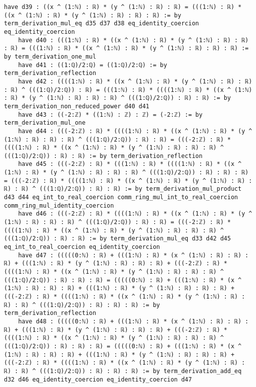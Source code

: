\documentclass{article}
\begin{document}
\begin{tcolorbox}[colback=white!10, width=\linewidth]
\begin{lstlisting}[language=Lean4]
    have d39 : ((x ^ (1:ℕ) : ℝ) * (y ^ (1:ℕ) : ℝ) : ℝ) = (((1:ℕ) : ℝ) * ((x ^ (1:ℕ) : ℝ) * (y ^ (1:ℕ) : ℝ) : ℝ) : ℝ) := by term_derivation_mul_eq d35 d37 d38 eq_identity_coercion eq_identity_coercion
    have d40 : (((1:ℕ) : ℝ) * ((x ^ (1:ℕ) : ℝ) * (y ^ (1:ℕ) : ℝ) : ℝ) : ℝ) = (((1:ℕ) : ℝ) * ((x ^ (1:ℕ) : ℝ) * (y ^ (1:ℕ) : ℝ) : ℝ) : ℝ) := by term_derivation_one_mul
    have d41 : ((1:ℚ)/2:ℚ) = ((1:ℚ)/2:ℚ) := by term_derivation_reflection
    have d42 : ((((1:ℕ) : ℝ) * ((x ^ (1:ℕ) : ℝ) * (y ^ (1:ℕ) : ℝ) : ℝ) : ℝ) ^ (((1:ℚ)/2:ℚ)) : ℝ) = (((1:ℕ) : ℝ) * ((((1:ℕ) : ℝ) * ((x ^ (1:ℕ) : ℝ) * (y ^ (1:ℕ) : ℝ) : ℝ) : ℝ) ^ (((1:ℚ)/2:ℚ)) : ℝ) : ℝ) := by term_derivation_non_reduced_power d40 d41
    have d43 : ((-2:ℤ) * ((1:ℕ) : ℤ) : ℤ) = (-2:ℤ) := by term_derivation_mul_one
    have d44 : (((-2:ℤ) : ℝ) * ((((1:ℕ) : ℝ) * ((x ^ (1:ℕ) : ℝ) * (y ^ (1:ℕ) : ℝ) : ℝ) : ℝ) ^ (((1:ℚ)/2:ℚ)) : ℝ) : ℝ) = (((-2:ℤ) : ℝ) * ((((1:ℕ) : ℝ) * ((x ^ (1:ℕ) : ℝ) * (y ^ (1:ℕ) : ℝ) : ℝ) : ℝ) ^ (((1:ℚ)/2:ℚ)) : ℝ) : ℝ) := by term_derivation_reflection
    have d45 : (((-2:ℤ) : ℝ) * (((1:ℕ) : ℝ) * ((((1:ℕ) : ℝ) * ((x ^ (1:ℕ) : ℝ) * (y ^ (1:ℕ) : ℝ) : ℝ) : ℝ) ^ (((1:ℚ)/2:ℚ)) : ℝ) : ℝ) : ℝ) = (((-2:ℤ) : ℝ) * ((((1:ℕ) : ℝ) * ((x ^ (1:ℕ) : ℝ) * (y ^ (1:ℕ) : ℝ) : ℝ) : ℝ) ^ (((1:ℚ)/2:ℚ)) : ℝ) : ℝ) := by term_derivation_mul_product d43 d44 eq_int_to_real_coercion comm_ring_mul_int_to_real_coercion comm_ring_mul_identity_coercion
    have d46 : (((-2:ℤ) : ℝ) * ((((1:ℕ) : ℝ) * ((x ^ (1:ℕ) : ℝ) * (y ^ (1:ℕ) : ℝ) : ℝ) : ℝ) ^ (((1:ℚ)/2:ℚ)) : ℝ) : ℝ) = (((-2:ℤ) : ℝ) * ((((1:ℕ) : ℝ) * ((x ^ (1:ℕ) : ℝ) * (y ^ (1:ℕ) : ℝ) : ℝ) : ℝ) ^ (((1:ℚ)/2:ℚ)) : ℝ) : ℝ) := by term_derivation_mul_eq d33 d42 d45 eq_int_to_real_coercion eq_identity_coercion
    have d47 : (((((0:ℕ) : ℝ) + (((1:ℕ) : ℝ) * (x ^ (1:ℕ) : ℝ) : ℝ) : ℝ) + (((1:ℕ) : ℝ) * (y ^ (1:ℕ) : ℝ) : ℝ) : ℝ) + (((-2:ℤ) : ℝ) * ((((1:ℕ) : ℝ) * ((x ^ (1:ℕ) : ℝ) * (y ^ (1:ℕ) : ℝ) : ℝ) : ℝ) ^ (((1:ℚ)/2:ℚ)) : ℝ) : ℝ) : ℝ) = (((((0:ℕ) : ℝ) + (((1:ℕ) : ℝ) * (x ^ (1:ℕ) : ℝ) : ℝ) : ℝ) + (((1:ℕ) : ℝ) * (y ^ (1:ℕ) : ℝ) : ℝ) : ℝ) + (((-2:ℤ) : ℝ) * ((((1:ℕ) : ℝ) * ((x ^ (1:ℕ) : ℝ) * (y ^ (1:ℕ) : ℝ) : ℝ) : ℝ) ^ (((1:ℚ)/2:ℚ)) : ℝ) : ℝ) : ℝ) := by term_derivation_reflection
    have d48 : (((((0:ℕ) : ℝ) + (((1:ℕ) : ℝ) * (x ^ (1:ℕ) : ℝ) : ℝ) : ℝ) + (((1:ℕ) : ℝ) * (y ^ (1:ℕ) : ℝ) : ℝ) : ℝ) + (((-2:ℤ) : ℝ) * ((((1:ℕ) : ℝ) * ((x ^ (1:ℕ) : ℝ) * (y ^ (1:ℕ) : ℝ) : ℝ) : ℝ) ^ (((1:ℚ)/2:ℚ)) : ℝ) : ℝ) : ℝ) = (((((0:ℕ) : ℝ) + (((1:ℕ) : ℝ) * (x ^ (1:ℕ) : ℝ) : ℝ) : ℝ) + (((1:ℕ) : ℝ) * (y ^ (1:ℕ) : ℝ) : ℝ) : ℝ) + (((-2:ℤ) : ℝ) * ((((1:ℕ) : ℝ) * ((x ^ (1:ℕ) : ℝ) * (y ^ (1:ℕ) : ℝ) : ℝ) : ℝ) ^ (((1:ℚ)/2:ℚ)) : ℝ) : ℝ) : ℝ) := by term_derivation_add_eq d32 d46 eq_identity_coercion eq_identity_coercion d47

\end{lstlisting}
\end{tcolorbox}
\end{document}
